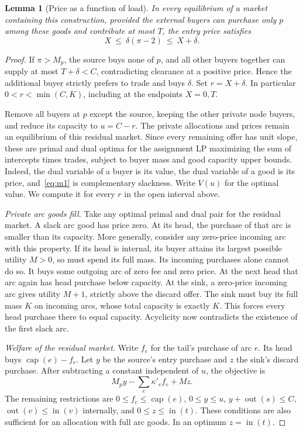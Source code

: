 \documentclass[11pt,oneside,openany,notitlepage]{report}
\newtheorem{lemma}[theorem]{Lemma}
\DeclareMathOperator{\caparc}{cap}
\begin{document}
\begin{lemma}[Price as a function of load]\label{lem:price}
In every equilibrium of a market containing this construction, provided
the external buyers can purchase only \(p\) among these goods and contribute
at most \(T\), the entry price satisfies
\[
                         X\ \le\ \delta(\pi-2)\ \le\ X+\delta .
\]
\end{lemma}
\begin{proof}
If \(\pi>M_p\), the source buys none of \(p\), and all other buyers together
can supply at most \(T+\delta<C\), contradicting clearance at a positive
price. Hence the additional buyer strictly prefers to trade and buys
\(\delta\). Set \(r=X+\delta\). In particular
\(0<r<\min(C,K)\), including at the endpoints \(X=0,T\).

Remove all buyers at \(p\) except the source, keeping the other private node
buyers, and reduce its capacity to \(u=C-r\). The private allocations and
prices remain an equilibrium of this residual market. Since every remaining
offer has unit slope, these are primal and dual optima for the assignment
LP maximizing the sum of intercepts times trades, subject to buyer mass and
good capacity upper bounds. Indeed, the dual variable of a buyer is its
value, the dual variable of a good is its price, and~\eqref{eq:m1} is
complementary slackness. Write \(V(u)\) for the optimal value. We compute
it for every \(r\) in the open interval above.

\emph{Private arc goods fill.}
Take any optimal primal and dual pair for the residual market. A slack arc
good has price zero. At its head, the purchase of that arc is smaller than
its capacity. More generally, consider any zero-price incoming arc with this
property. If its head is internal, its buyer attains its largest possible
utility \(M>0\), so must spend its full mass. Its incoming purchases alone
cannot do so. It buys some outgoing arc of zero fee and zero price. At the
next head that arc again has head purchase below capacity. At the sink, a
zero-price incoming arc gives utility \(M+1\), strictly above the discard
offer. The sink must buy its full mass \(K\) on incoming arcs, whose total
capacity is exactly \(K\). This forces every head purchase there to equal
capacity. Acyclicity now contradicts the existence of the first slack arc.

\emph{Welfare of the residual market.}
Write \(f_e\) for the tail's purchase of arc \(e\). Its head buys
\(\caparc(e)-f_e\). Let \(y\) be the source's entry purchase and \(z\) the
sink's discard purchase. After subtracting a constant independent of \(u\),
the objective is
\[
                M_p y-\sum_e\kappa'_e f_e+Mz .
\]
The remaining restrictions are \(0\le f_e\le\caparc(e)\),
\(0\le y\le u\), \(y+\operatorname{out}(s)\le C\),
\(\operatorname{out}(v)\le\operatorname{in}(v)\) internally, and
\(0\le z\le\operatorname{in}(t)\). These conditions are also sufficient
for an allocation with full arc goods. In an optimum
\(z=\operatorname{in}(t)\).


\end{proof}
\end{document}
